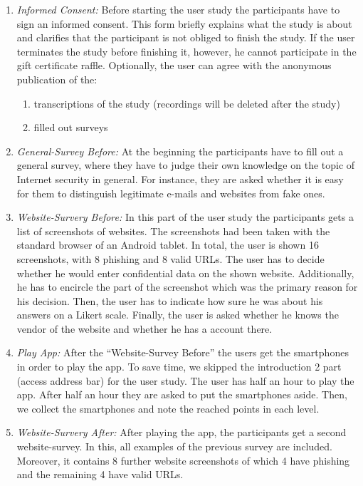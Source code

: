 \begin{enumerate}
	\item \textit{Informed Consent:} Before starting the user study the participants have to sign an informed consent.
This form briefly explains what the study is about and clarifies that the participant is not obliged to finish the study.
If the user terminates the study before finishing it, however, he cannot participate in the gift certificate raffle.
Optionally, the user can agree with the anonymous publication of the:
	\begin{enumerate}
		\item transcriptions of the study (recordings will be deleted after the study)
		\item filled out surveys
	\end{enumerate}

	\item \textit{General-Survey Before:} At the beginning the participants have to fill out a general survey, where they have to judge their own knowledge on the topic of Internet security in general.
 For instance, they are asked whether it is easy for them to distinguish legitimate e-mails and websites from fake ones.

	\item \textit{Website-Survery Before:} In this part of the user study the participants gets a list of screenshots of websites.
 The screenshots had been taken with the standard browser of an Android tablet.
 In total, the user is shown 16 screenshots, with 8 phishing and 8 valid URLs.
 The user has to decide whether he would enter confidential data on the shown website.
 Additionally, he has to encircle the part of the screenshot which was the primary reason for his decision.
 Then, the user has to indicate how sure he was about his answers on a Likert scale.
 Finally, the user is asked whether he knows the vendor of the website and whether he has a account there.

	\item \textit{Play App:} After the ``Website-Survey Before'' the users get the smartphones in order to play the app.
 To save time, we skipped the introduction 2 part (access address bar) for the user study.
 The user has half an hour to play the app.
 After half an hour they are asked to put the smartphones aside.
 Then, we collect the smartphones and note the reached points in each level.

	\item \textit{Website-Survery After:} After playing the app, the participants get a second website-survey.
 In this, all examples of the previous survey are included.
 Moreover, it contains 8 further website screenshots of which 4 have phishing and the remaining 4 have valid URLs.


\end{enumerate}
